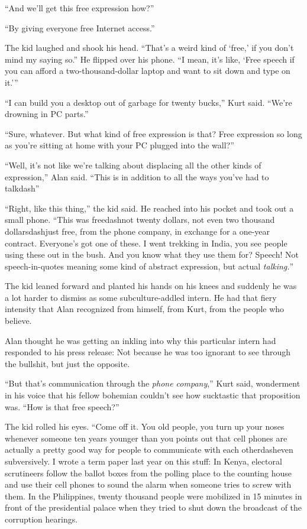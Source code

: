 ``And we'll get this free expression how?''

``By giving everyone free Internet access.''

The kid laughed and shook his head.  ``That's a weird kind of `free,'
if you don't mind my saying so.'' He flipped over his phone.  ``I
mean, it's like, `Free speech if you can afford a two-thousand-dollar
laptop and want to sit down and type on it.'''

``I can build you a desktop out of garbage for twenty bucks,'' Kurt
said.  ``We're drowning in PC parts.''

``Sure, whatever.  But what kind of free expression is that?  Free
expression so long as you're sitting at home with your PC plugged into
the wall?''

``Well, it's not like we're talking about displacing all the other
kinds of expression,'' Alan said.  ``This is in addition to all the
ways you've had to talkdash{}''

``Right, like this thing,'' the kid said.  He reached into his pocket
and took out a small phone.  ``This was freedash{}not twenty dollars, not
even two thousand dollarsdash{}just free, from the phone company, in
exchange for a one-year contract.  Everyone's got one of these.  I
went trekking in India, you see people using these out in the bush. 
And you know what they use them for?  Speech!  Not speech-in-quotes
meaning some kind of abstract expression, but actual
\textit{talking.}''

The kid leaned forward and planted his hands on his knees and suddenly
he was a lot harder to dismiss as some subculture-addled intern.  He
had that fiery intensity that Alan recognized from himself, from Kurt,
from the people who believe.

Alan thought he was getting an inkling into why this particular intern
had responded to his press release:  Not because he was too ignorant
to see through the bullshit, but just the opposite.

``But that's communication through the \textit{phone company},'' Kurt
said, wonderment in his voice that his fellow bohemian couldn't see
how sucktastic that proposition was.  ``How is that free speech?''

The kid rolled his eyes.  ``Come off it.  You old people, you turn up
your noses whenever someone ten years younger than you points out that
cell phones are actually a pretty good way for people to communicate
with each otherdash{}even subversively.  I wrote a term paper last year
on this stuff:  In Kenya, electoral scrutineers follow the ballot
boxes from the polling place to the counting house and use their cell
phones to sound the alarm when someone tries to screw with them.  In
the Philippines, twenty thousand people were mobilized in 15 minutes
in front of the presidential palace when they tried to shut down the
broadcast of the corruption hearings.

